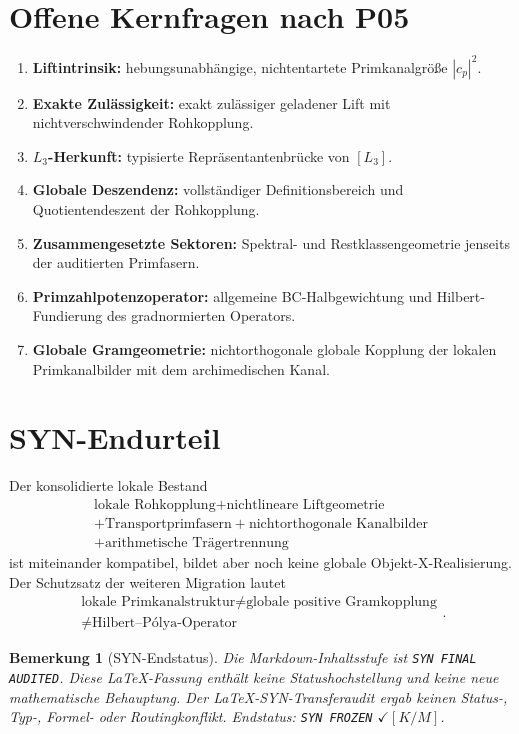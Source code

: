 \documentclass[11pt,a4paper]{amsart}
\newtheorem{remark}[theorem]{Bemerkung}
\newcommand{\stKM}{\ensuremath{\checkmark[K/M]}}
\begin{document}
\section{Offene Kernfragen nach P05}

\begin{enumerate}
\item \textbf{Liftintrinsik:} hebungsunabhängige, nichtentartete Primkanalgröße
$|c_p|^2$.
\item \textbf{Exakte Zulässigkeit:} exakt zulässiger geladener Lift mit
nichtverschwindender Rohkopplung.
\item \textbf{$L_3$-Herkunft:} typisierte Repräsentantenbrücke von $[L_3]$.
\item \textbf{Globale Deszendenz:} vollständiger Definitionsbereich und
Quotientendeszent der Rohkopplung.
\item \textbf{Zusammengesetzte Sektoren:} Spektral- und Restklassengeometrie
jenseits der auditierten Primfasern.
\item \textbf{Primzahlpotenzoperator:} allgemeine BC-Halbgewichtung und
Hilbert-Fundierung des gradnormierten Operators.
\item \textbf{Globale Gramgeometrie:} nichtorthogonale globale Kopplung der
lokalen Primkanalbilder mit dem archimedischen Kanal.
\end{enumerate}

\section{SYN-Endurteil}

Der konsolidierte lokale Bestand
\[
\boxed{\begin{gathered}
\text{lokale Rohkopplung}+\text{nichtlineare Liftgeometrie}\\
+\text{Transportprimfasern}+\text{nichtorthogonale Kanalbilder}\\
+\text{arithmetische Trägertrennung}
\end{gathered}}
\]
ist miteinander kompatibel, bildet aber noch keine globale
Objekt-X-Realisierung. Der Schutzsatz der weiteren Migration lautet
\[
\boxed{\begin{gathered}
\text{lokale Primkanalstruktur}\neq\text{globale positive Gramkopplung}\\
\neq\text{Hilbert--Pólya-Operator}
\end{gathered}}.
\]

\begin{remark}[SYN-Endstatus]
Die Markdown-Inhaltsstufe ist \texttt{SYN FINAL AUDITED}. Diese LaTeX-Fassung
enthält keine Statushochstellung und keine neue mathematische Behauptung. Der
LaTeX-SYN-Transferaudit ergab keinen Status-, Typ-, Formel- oder
Routingkonflikt. Endstatus: \texttt{SYN FROZEN} \stKM.
\end{remark}
\end{document}

